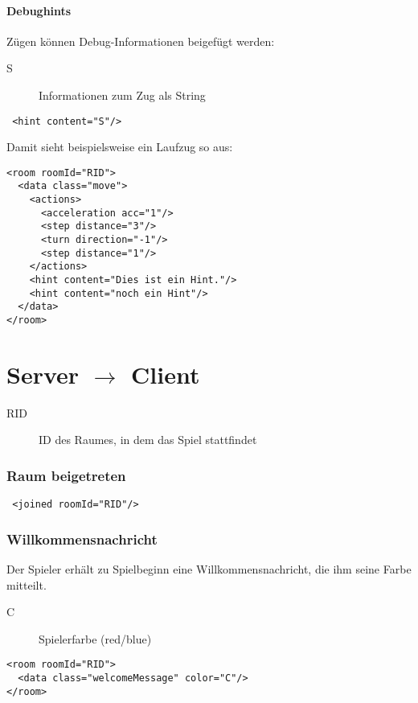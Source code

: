 \documentclass[12pt,a4paper, ngerman, oneside]{scrartcl}
\begin{document}
\subsection{Debughints}
Zügen können Debug-Informationen beigefügt werden:
\begin{description}
\item[S] Informationen zum Zug als String
\end{description}
\begin{verbatim}
 <hint content="S"/>
\end{verbatim}
Damit sieht beispielsweise ein Laufzug so aus:
\begin{verbatim}
<room roomId="RID">
  <data class="move">
    <actions>
      <acceleration acc="1"/>
      <step distance="3"/>
      <turn direction="-1"/>
      <step distance="1"/>
    </actions>
    <hint content="Dies ist ein Hint."/>
    <hint content="noch ein Hint"/>
  </data>
</room>
\end{verbatim}



\newpage
\part{Server $\rightarrow$ Client}
\begin{description}
\item[RID] ID des Raumes, in dem das Spiel stattfindet
\end{description}

\section{Raum beigetreten}
 \begin{verbatim}
 <joined roomId="RID"/>
 \end{verbatim}

\section{Willkommensnachricht}
Der Spieler erhält zu Spielbeginn eine Willkommensnachricht, die ihm seine Farbe mitteilt.
\begin{description}
\item[C] Spielerfarbe (red/blue)
\end{description}
\begin{verbatim}
<room roomId="RID">
  <data class="welcomeMessage" color="C"/>
</room>
\end{verbatim}
\end{document}
